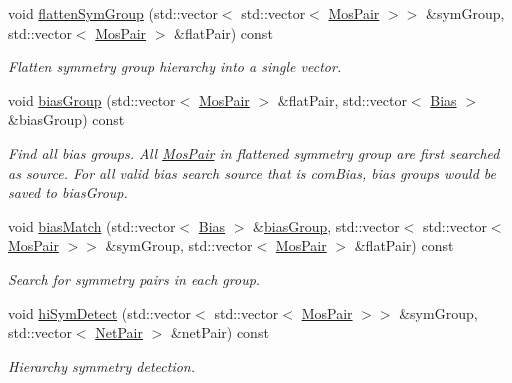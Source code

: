 \begin{DoxyCompactItemize}
void \hyperlink{classSymDetect_a4c50f078fd01ab52e8f50b0507b69556}{flatten\+Sym\+Group} (std\+::vector$<$ std\+::vector$<$ \hyperlink{classMosPair}{Mos\+Pair} $>$$>$ \&sym\+Group, std\+::vector$<$ \hyperlink{classMosPair}{Mos\+Pair} $>$ \&flat\+Pair) const
\begin{DoxyCompactList}\small\item\em Flatten symmetry group hierarchy into a single vector. \end{DoxyCompactList}\item 
void \hyperlink{classSymDetect_a18905625f000221a5d4fe3c7cfdb5e8f}{bias\+Group} (std\+::vector$<$ \hyperlink{classMosPair}{Mos\+Pair} $>$ \&flat\+Pair, std\+::vector$<$ \hyperlink{classBias}{Bias} $>$ \&bias\+Group) const
\begin{DoxyCompactList}\small\item\em Find all bias groups. All \hyperlink{classMosPair}{Mos\+Pair} in flattened symmetry group are first searched as source. For all valid bias search source that is com\+Bias, bias groups would be saved to bias\+Group. \end{DoxyCompactList}\item 
void \hyperlink{classSymDetect_a4c7109dd0519c1c11765fe00f4a21fe2}{bias\+Match} (std\+::vector$<$ \hyperlink{classBias}{Bias} $>$ \&\hyperlink{classSymDetect_a18905625f000221a5d4fe3c7cfdb5e8f}{bias\+Group}, std\+::vector$<$ std\+::vector$<$ \hyperlink{classMosPair}{Mos\+Pair} $>$$>$ \&sym\+Group, std\+::vector$<$ \hyperlink{classMosPair}{Mos\+Pair} $>$ \&flat\+Pair) const
\begin{DoxyCompactList}\small\item\em Search for symmetry pairs in each group. \end{DoxyCompactList}\item 
void \hyperlink{classSymDetect_a961c1dec1cb00000c9ed107dedac50ec}{hi\+Sym\+Detect} (std\+::vector$<$ std\+::vector$<$ \hyperlink{classMosPair}{Mos\+Pair} $>$$>$ \&sym\+Group, std\+::vector$<$ \hyperlink{classNetPair}{Net\+Pair} $>$ \&net\+Pair) const
\begin{DoxyCompactList}\small\item\em Hierarchy symmetry detection. \end{DoxyCompactList}\end{DoxyCompactItemize}

